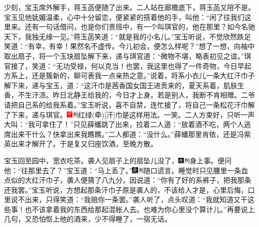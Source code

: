 少刻，宝玉席外解手，蒋玉菡便随了出来。二人站在廊檐底下，蒋玉菡又陪不是。宝玉见他妩媚温柔，心中十分留恋，便紧紧的搭着他的手，叫他：“闲了往我们这里来。还有一句话借问，也是你们贵班中，有一个叫琪官的，他在那里？如今名驰天下，我独无缘一见。”蒋玉菡笑道：“就是我的小名儿。”宝玉听说，不觉欣然跌足笑道：“有幸，有幸！果然名不虚传。今儿初会，便怎么样呢？”想了一想，向袖中取出扇子，将一个玉玦扇坠解下来，递与琪官道：“微物不堪，略表初见之谊。”琪官接了，笑道：“无功受禄，何以克当！也罢，我这里也得了一件奇物，今日早起方系上，还是簇新的，聊可表我一点亲热之意。”说着，将系小衣儿一条大红汗巾子解下来，递与宝玉，道：“这汗巾是茜香国女国王进贡来的，夏天系着，肌肤生香，不生汗渍。昨日北静王给我的，今日才上身。若是别人，我断不肯相赠。二爷请把自己系的给我系着。”宝玉听说，喜不自禁，连忙接了，将自己一条松花汗巾解了下来，递与琪官。{\includegraphics[width=3mm]{../Images/00002}\includegraphics[width=3mm]{../Images/00011}\footnotesize \kaishu 红绿{(牵)}{[}汗{]}巾是这样用法。一笑。}二人方束好，只听一声大叫：“我可拿住了！”只见薛蟠跳了出来，拉着二人道：“放着酒不吃，两个人逃席出来干什么？快拿出来我瞧瞧。”二人都道：“没什么。”薛蟠那里肯依，还是冯紫英出来才解开了。于是复又归座饮酒，至晚方散。

宝玉回至园中，宽衣吃茶。袭人见扇子上的扇坠儿没了，{\includegraphics[width=3mm]{../Images/00004}\includegraphics[width=3mm]{../Images/00011}\footnotesize \kaishu 身上事。}便问他：“往那里去了？”宝玉道：“马上丢了。”{\includegraphics[width=3mm]{../Images/00004}\includegraphics[width=3mm]{../Images/00011}\footnotesize \kaishu 随口谎言。}睡觉时只见腰里一条血点似的大红汗巾子，袭人便猜了八九分，因说道：“你有了好的系裤子，把我那条还我罢。”宝玉听说，方想起那条汗巾子原是袭人的，不该给人才是，心里后悔，口里说不出来，只得笑道：“我赔你一条罢。”袭人听了，点头叹道：“我就知道又干这些事！也不该拿着我的东西给那起混帐人去。也难为你心里没个算计儿。”再要说上几句，又恐怕怄上他的酒来，少不得睡了，一宿无话。

